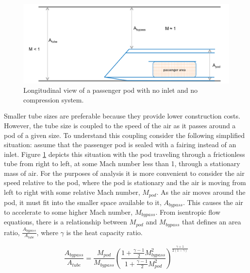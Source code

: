 \documentclass[heading.tex]{subfiles}
\begin{document}
\begin{figure}[hbtp]
\centering
\includegraphics[width=.85\textwidth]{images/closedCapsule.png}
\caption{Longitudinal view of a passenger pod with no inlet and no compression system.}
\label{f:ClosedPod}
\end{figure}

Smaller tube sizes are preferable because they provide lower construction costs. However, 
the tube size is coupled to the speed of the air as it passes around a pod of a given size. 
To understand this coupling consider the following simplified situation: assume that the passenger pod is sealed with a fairing
instead of an inlet. Figure \ref{f:ClosedPod} depicts this situation with the pod
traveling through a frictionless tube from right to left, at some Mach number less than 1, through a stationary mass of air. 
For the purposes of analysis it is more convenient to consider the air speed relative to the pod, 
where the pod is stationary and the air is moving from left to right with some relative Mach number, $M_{pod}$. 
As the air moves around the pod, it must fit into the smaller space available to it, $A_{bypass}$.
This causes the air to accelerate to some higher Mach number, $M_{bypass}$.
From isentropic flow equations, there is a relationship between 
$M_{pod}$ and $M_{bypass}$ that defines an area ratio, $\frac{A_{bypass}}{A_{tube}}$, where $\gamma$ is the heat capacity ratio.

\begin{equation}
\frac{A_{bypass}}{A_{tube}} = \frac{M_{pod}}{M_{bypass}}
\left(\frac{1+ \frac{\gamma-1}{2} M_{bypass}^2}
{1+ \frac{\gamma-1}{2} M_{pod}^2}\right)^{\frac{\gamma+1}{2\left(1-\gamma\right)}}
\label{e:a-over-astar}
\end{equation}
\end{document}
